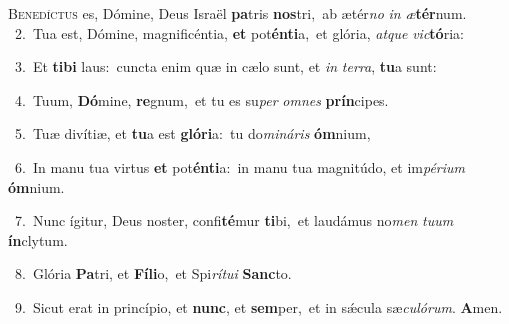 \lettrine{\initial\textcolor{\initialcolor}{B}}{enedíctus} es, Dómine, Deus Israël \textbf{pa}\-tris \textbf{nos}\-tri,~\star ab ætér\textit{no} \textit{in} \textit{æ}\-\textbf{tér}num.\\
{\numbfont\textcolor{\numbcolor}{~2.}}~Tua est, Dómine, magnificéntia, \textbf{et} pot\-\textbf{én}\-\textbf{ti}a,~\star et glória, \textit{at}\-\textit{que} \textit{vic}\-\textbf{tó}ria:\par
{\numbfont\textcolor{\numbcolor}{~3.}}~Et \textbf{ti}\-\textbf{bi} laus:~\star cuncta enim quæ in cælo sunt, et \textit{in} \textit{ter}\-\textit{ra}, \textbf{tu}\-a sunt:\par
{\numbfont\textcolor{\numbcolor}{~4.}}~Tuum, \textbf{Dó}\-mine, \textbf{re}\-gnum,~\star et tu es su\textit{per} \textit{om}\-\textit{nes} \textbf{prín}\-cipes.\par
{\numbfont\textcolor{\numbcolor}{~5.}}~Tuæ divítiæ, et \textbf{tu}\-a est \textbf{gló}\-\textbf{ri}a:~\star tu do\-\textit{mi}\-\textit{ná}\textit{ris} \textbf{óm}\-nium,\par
{\numbfont\textcolor{\numbcolor}{~6.}}~In manu tua virtus \textbf{et} pot\-\textbf{én}\-\textbf{ti}a:~\star in manu tua magnitúdo, et im\-\textit{pé}\-\textit{ri}\textit{um} \textbf{óm}\-nium.\par
{\numbfont\textcolor{\numbcolor}{~7.}}~Nunc ígitur, Deus noster, confi\-\textbf{té}\-mur \textbf{ti}\-bi,~\star et laudámus no\textit{men} \textit{tu}\-\textit{um} \textbf{ín}\-clytum.\par
{\numbfont\textcolor{\numbcolor}{~8.}}~Glória \textbf{Pa}\-tri, et \textbf{Fí}\-\textbf{li}o,~\star et Spi\-\textit{rí}\-\textit{tu}\textit{i} \textbf{Sanc}\-to.\par
{\numbfont\textcolor{\numbcolor}{~9.}}~Sicut erat in princípio, et \textbf{nunc}\-, et \textbf{sem}\-per,~\star et in sǽcula sæ\-\textit{cu}\-\textit{ló}\textit{rum}. \textbf{A}\-men.\par
